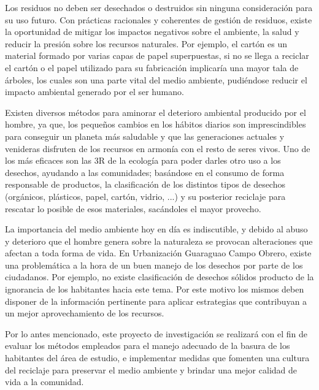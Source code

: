 Los residuos no deben ser desechados o destruidos sin ninguna consideración para su uso futuro. Con prácticas racionales y coherentes de gestión de residuos, existe la oportunidad de mitigar los impactos negativos sobre el ambiente, la salud y reducir la presión sobre los recursos naturales. Por ejemplo, el cartón es un material formado por varias capas de papel superpuestas, si no se llega a reciclar el cartón o el papel utilizado para su fabricación implicaría una mayor tala de árboles, los cuales son una parte vital del medio ambiente, pudiéndose reducir el impacto ambiental generado por el ser humano.

Existen diversos métodos para aminorar el deterioro ambiental producido por el hombre, ya que, los pequeños cambios en los hábitos diarios son imprescindibles para conseguir un planeta más saludable y que las generaciones actuales y venideras disfruten de los recursos en armonía con el resto de seres vivos. Uno de los más eficaces son las 3R de la ecología para poder darles otro uso a los desechos, ayudando a las comunidades; basándose en el consumo de forma responsable de productos, la clasificación de los distintos tipos de desechos (orgánicos, plásticos, papel, cartón, vidrio, ...) y su posterior reciclaje para rescatar lo posible de esos materiales, sacándoles el mayor provecho.

 La importancia del medio ambiente hoy en día es indiscutible, y debido al abuso y deterioro que el hombre genera sobre la naturaleza se provocan alteraciones que afectan a toda forma de vida. En Urbanización Guaraguao Campo Obrero, existe una problemática a la hora de un buen manejo de los desechos por parte de los ciudadanos. Por ejemplo, no existe clasificación de desechos sólidos producto de la ignorancia de los habitantes hacia este tema. Por este motivo los mismos deben disponer de la información pertinente para aplicar estrategias que contribuyan a un mejor aprovechamiento de los recursos.

Por lo antes mencionado, este proyecto de investigación se realizará con el fin de evaluar los métodos empleados para el manejo adecuado de la basura de los habitantes del área de estudio, e implementar medidas que fomenten una cultura del reciclaje para preservar el medio ambiente y brindar una mejor calidad de vida a la comunidad.

\newpage

